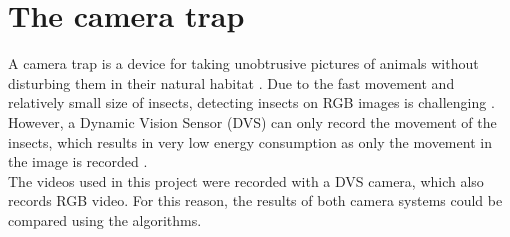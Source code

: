 \section{The camera trap}
A camera trap is a device for taking unobtrusive pictures of animals without disturbing them in their natural habitat \cite{Swann2011}. Due to the fast movement and relatively small size of insects, detecting insects on RGB images is challenging \cite{Gebauer_2024_WACV}. However, a \glqq Dynamic Vision Sensor\grqq{} (DVS) can only record the movement of the insects, which results in very low energy consumption as only the movement in the image is recorded \cite{Gebauer_2024_WACV}. \\
The videos used in this project were recorded with a DVS camera, which also records RGB video. For this reason, the results of both camera systems could be compared using the algorithms.

